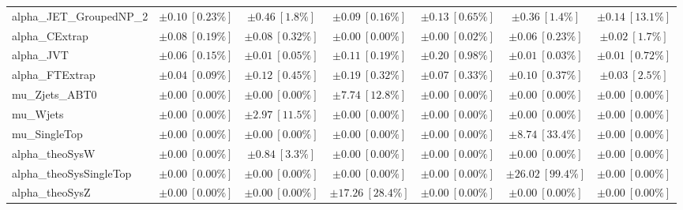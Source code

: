 \begin{sidewaystable}
\begin{center}
\begin{tabular*}{\textwidth}{@{\extracolsep{\fill}}lcccccc}
alpha\_JET\_GroupedNP\_2         & $\pm 0.10\ [0.23\%] $          & $\pm 0.46\ [1.8\%] $          & $\pm 0.09\ [0.16\%] $          & $\pm 0.13\ [0.65\%] $          & $\pm 0.36\ [1.4\%] $          & $\pm 0.14\ [13.1\%] $       \\
alpha\_CExtrap         & $\pm 0.08\ [0.19\%] $          & $\pm 0.08\ [0.32\%] $          & $\pm 0.00\ [0.00\%] $          & $\pm 0.00\ [0.02\%] $          & $\pm 0.06\ [0.23\%] $          & $\pm 0.02\ [1.7\%] $       \\
alpha\_JVT         & $\pm 0.06\ [0.15\%] $          & $\pm 0.01\ [0.05\%] $          & $\pm 0.11\ [0.19\%] $          & $\pm 0.20\ [0.98\%] $          & $\pm 0.01\ [0.03\%] $          & $\pm 0.01\ [0.72\%] $       \\
alpha\_FTExtrap         & $\pm 0.04\ [0.09\%] $          & $\pm 0.12\ [0.45\%] $          & $\pm 0.19\ [0.32\%] $          & $\pm 0.07\ [0.33\%] $          & $\pm 0.10\ [0.37\%] $          & $\pm 0.03\ [2.5\%] $       \\
mu\_Zjets\_ABT0         & $\pm 0.00\ [0.00\%] $          & $\pm 0.00\ [0.00\%] $          & $\pm 7.74\ [12.8\%] $          & $\pm 0.00\ [0.00\%] $          & $\pm 0.00\ [0.00\%] $          & $\pm 0.00\ [0.00\%] $       \\
mu\_Wjets         & $\pm 0.00\ [0.00\%] $          & $\pm 2.97\ [11.5\%] $          & $\pm 0.00\ [0.00\%] $          & $\pm 0.00\ [0.00\%] $          & $\pm 0.00\ [0.00\%] $          & $\pm 0.00\ [0.00\%] $       \\
mu\_SingleTop         & $\pm 0.00\ [0.00\%] $          & $\pm 0.00\ [0.00\%] $          & $\pm 0.00\ [0.00\%] $          & $\pm 0.00\ [0.00\%] $          & $\pm 8.74\ [33.4\%] $          & $\pm 0.00\ [0.00\%] $       \\
alpha\_theoSysW         & $\pm 0.00\ [0.00\%] $          & $\pm 0.84\ [3.3\%] $          & $\pm 0.00\ [0.00\%] $          & $\pm 0.00\ [0.00\%] $          & $\pm 0.00\ [0.00\%] $          & $\pm 0.00\ [0.00\%] $       \\
alpha\_theoSysSingleTop         & $\pm 0.00\ [0.00\%] $          & $\pm 0.00\ [0.00\%] $          & $\pm 0.00\ [0.00\%] $          & $\pm 0.00\ [0.00\%] $          & $\pm 26.02\ [99.4\%] $          & $\pm 0.00\ [0.00\%] $       \\
alpha\_theoSysZ         & $\pm 0.00\ [0.00\%] $          & $\pm 0.00\ [0.00\%] $          & $\pm 17.26\ [28.4\%] $          & $\pm 0.00\ [0.00\%] $          & $\pm 0.00\ [0.00\%] $          & $\pm 0.00\ [0.00\%] $       \\

\end{tabular*}
\end{center}
\end{sidewaystable}
